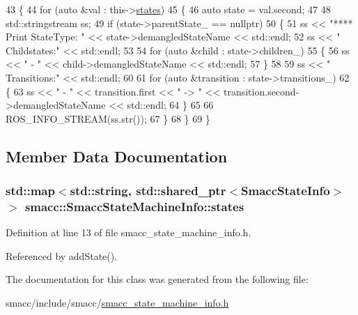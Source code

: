 \begin{DoxyCode}
43     \{
44         \textcolor{keywordflow}{for} (\textcolor{keyword}{auto} &val : this->\hyperlink{classsmacc_1_1SmaccStateMachineInfo_a8d6f1a9ce60f39835e7aa2179139977f}{states})
45         \{
46             \textcolor{keyword}{auto} state = val.second;
47 
48             std::stringstream ss;
49             \textcolor{keywordflow}{if} (state->parentState\_ == \textcolor{keyword}{nullptr})
50             \{
51                 ss << \textcolor{stringliteral}{"**** Print StateType: "} << state->demangledStateName << std::endl;
52                 ss << \textcolor{stringliteral}{" Childstates:"} << std::endl;
53 
54                 \textcolor{keywordflow}{for} (\textcolor{keyword}{auto} &child : state->children\_)
55                 \{
56                     ss << \textcolor{stringliteral}{" - "} << child->demangledStateName << std::endl;
57                 \}
58 
59                 ss << \textcolor{stringliteral}{" Transitions:"} << std::endl;
60 
61                 \textcolor{keywordflow}{for} (\textcolor{keyword}{auto} &transition : state->transitions\_)
62                 \{
63                     ss << \textcolor{stringliteral}{" - "} << transition.first << \textcolor{stringliteral}{" -> "} << transition.second->demangledStateName << 
      std::endl;
64                 \}
65 
66                 ROS\_INFO\_STREAM(ss.str());
67             \}
68         \}
69     \}
\end{DoxyCode}


\subsection{Member Data Documentation}
\subsubsection[{\texorpdfstring{states}{states}}]{\setlength{\rightskip}{0pt plus 5cm}std\+::map$<$std\+::string, std\+::shared\+\_\+ptr$<${\bf Smacc\+State\+Info}$>$ $>$ smacc\+::\+Smacc\+State\+Machine\+Info\+::states}\hypertarget{classsmacc_1_1SmaccStateMachineInfo_a8d6f1a9ce60f39835e7aa2179139977f}{}\label{classsmacc_1_1SmaccStateMachineInfo_a8d6f1a9ce60f39835e7aa2179139977f}


Definition at line 13 of file smacc\+\_\+state\+\_\+machine\+\_\+info.\+h.



Referenced by add\+State().



The documentation for this class was generated from the following file\+:\begin{DoxyCompactItemize}
\item 
smacc/include/smacc/\hyperlink{smacc__state__machine__info_8h}{smacc\+\_\+state\+\_\+machine\+\_\+info.\+h}\end{DoxyCompactItemize}
